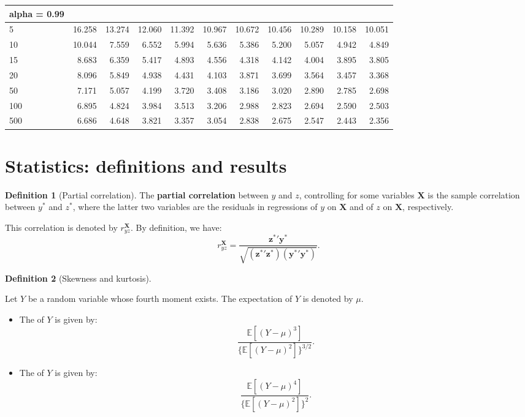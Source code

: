 \documentclass[
]{book}
\providecommand{\tightlist}{%
  \setlength{\itemsep}{0pt}\setlength{\parskip}{0pt}}
\theoremstyle{definition}
\newtheorem{definition}{Definition}[chapter]
\theoremstyle{definition}
\theoremstyle{definition}
\theoremstyle{definition}
\theoremstyle{remark}
\begin{document}
\begin{table}
\begin{tabular}[t]{l|r|r|r|r|r|r|r|r|r|r}
\hline
alpha = 0.99 &  &  &  &  &  &  &  &  &  & \\
\hline
5 & 16.258 & 13.274 & 12.060 & 11.392 & 10.967 & 10.672 & 10.456 & 10.289 & 10.158 & 10.051\\
\hline
10 & 10.044 & 7.559 & 6.552 & 5.994 & 5.636 & 5.386 & 5.200 & 5.057 & 4.942 & 4.849\\
\hline
15 & 8.683 & 6.359 & 5.417 & 4.893 & 4.556 & 4.318 & 4.142 & 4.004 & 3.895 & 3.805\\
\hline
20 & 8.096 & 5.849 & 4.938 & 4.431 & 4.103 & 3.871 & 3.699 & 3.564 & 3.457 & 3.368\\
\hline
50 & 7.171 & 5.057 & 4.199 & 3.720 & 3.408 & 3.186 & 3.020 & 2.890 & 2.785 & 2.698\\
\hline
100 & 6.895 & 4.824 & 3.984 & 3.513 & 3.206 & 2.988 & 2.823 & 2.694 & 2.590 & 2.503\\
\hline
500 & 6.686 & 4.648 & 3.821 & 3.357 & 3.054 & 2.838 & 2.675 & 2.547 & 2.443 & 2.356\\
\hline
\end{tabular}
\end{table}

\hypertarget{variousResults}{%
\section{Statistics: definitions and results}\label{variousResults}}

\begin{definition}[Partial correlation]
\protect\hypertarget{def:partialcorrel}{}\label{def:partialcorrel}The \textbf{partial correlation} between \(y\) and \(z\), controlling for some variables \(\mathbf{X}\) is the sample correlation between \(y^*\) and \(z^*\), where the latter two variables are the residuals in regressions of \(y\) on \(\mathbf{X}\) and of \(z\) on \(\mathbf{X}\), respectively.

This correlation is denoted by \(r_{yz}^\mathbf{X}\). By definition, we have:
\begin{equation}
r_{yz}^\mathbf{X} = \frac{\mathbf{z^*}'\mathbf{y^*}}{\sqrt{(\mathbf{z^*}'\mathbf{z^*})(\mathbf{y^*}'\mathbf{y^*})}}.\label{eq:pc}
\end{equation}
\end{definition}

\begin{definition}[Skewness and kurtosis]
\protect\hypertarget{def:skewnesskurtosis}{}\label{def:skewnesskurtosis}

Let \(Y\) be a random variable whose fourth moment exists. The expectation of \(Y\) is denoted by \(\mu\).

\begin{itemize}
\tightlist
\item
  The \color{blue}{skewness} of \(Y\) is given by:
  \[
  \frac{\mathbb{E}[(Y-\mu)^3]}{\{\mathbb{E}[(Y-\mu)^2]\}^{3/2}}.
  \]
\item
  The \color{blue}{kurtosis} of \(Y\) is given by:
  \[
  \frac{\mathbb{E}[(Y-\mu)^4]}{\{\mathbb{E}[(Y-\mu)^2]\}^{2}}.
  \]
\end{itemize}

\end{definition}
\end{document}

